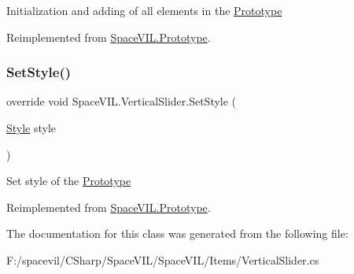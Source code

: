Initialization and adding of all elements in the \mbox{\hyperlink{class_space_v_i_l_1_1_prototype}{Prototype}} 



Reimplemented from \mbox{\hyperlink{class_space_v_i_l_1_1_prototype_ac3379fe02923ee155b5b0084abf27420}{Space\+V\+I\+L.\+Prototype}}.

\mbox{\label{class_space_v_i_l_1_1_vertical_slider_af6e1f3b91c48cecf0bd791c787d3fe0d}} 
\subsubsection{\texorpdfstring{Set\+Style()}{SetStyle()}}
{\footnotesize\ttfamily override void Space\+V\+I\+L.\+Vertical\+Slider.\+Set\+Style (\begin{DoxyParamCaption}\item[{\mbox{\hyperlink{class_space_v_i_l_1_1_decorations_1_1_style}{Style}}}]{style }\end{DoxyParamCaption})\hspace{0.3cm}{\ttfamily [virtual]}}



Set style of the \mbox{\hyperlink{class_space_v_i_l_1_1_prototype}{Prototype}} 



Reimplemented from \mbox{\hyperlink{class_space_v_i_l_1_1_prototype_ae96644a6ace490afb376fb542161e541}{Space\+V\+I\+L.\+Prototype}}.



The documentation for this class was generated from the following file\+:\begin{DoxyCompactItemize}
\item 
F\+:/spacevil/\+C\+Sharp/\+Space\+V\+I\+L/\+Space\+V\+I\+L/\+Items/Vertical\+Slider.\+cs\end{DoxyCompactItemize}
